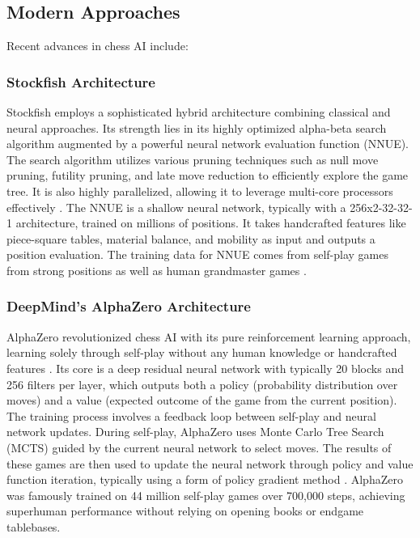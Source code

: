 \documentclass[conference]{IEEEtran}
\begin{document}
\subsection{Modern Approaches}
Recent advances in chess AI include:

\subsubsection{Stockfish Architecture}
Stockfish employs a sophisticated hybrid architecture combining classical and neural approaches. Its strength lies in its highly optimized alpha-beta search algorithm augmented by a powerful neural network evaluation function (NNUE). The search algorithm utilizes various pruning techniques such as null move pruning, futility pruning, and late move reduction to efficiently explore the game tree. It is also highly parallelized, allowing it to leverage multi-core processors effectively \cite{b4}. The NNUE is a shallow neural network, typically with a 256x2-32-32-1 architecture, trained on millions of positions. It takes handcrafted features like piece-square tables, material balance, and mobility as input and outputs a position evaluation. The training data for NNUE comes from self-play games from strong positions as well as human grandmaster games \cite{b4}.

\subsubsection{DeepMind's AlphaZero Architecture}
AlphaZero revolutionized chess AI with its pure reinforcement learning approach, learning solely through self-play without any human knowledge or handcrafted features \cite{b1}. Its core is a deep residual neural network with typically 20 blocks and 256 filters per layer, which outputs both a policy (probability distribution over moves) and a value (expected outcome of the game from the current position). The training process involves a feedback loop between self-play and neural network updates. During self-play, AlphaZero uses Monte Carlo Tree Search (MCTS) guided by the current neural network to select moves. The results of these games are then used to update the neural network through policy and value function iteration, typically using a form of policy gradient method \cite{b1}. AlphaZero was famously trained on 44 million self-play games over 700,000 steps, achieving superhuman performance without relying on opening books or endgame tablebases.
\end{document}
